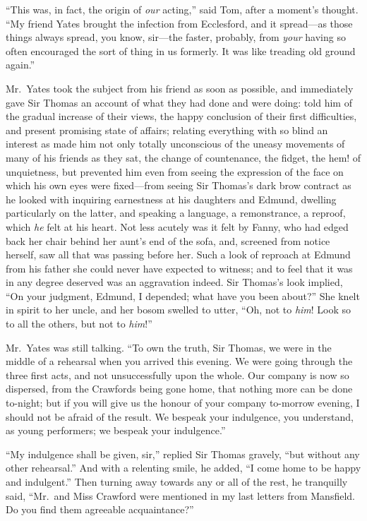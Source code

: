 \documentclass{article}
\begin{document}
``This was, in fact, the origin of \emph{our} acting,'' said Tom,
after a moment's thought.  ``My friend Yates brought the
infection from Ecclesford, and it spread---as those things
always spread, you know, sir---the faster, probably,
from \emph{your} having so often encouraged the sort of thing
in us formerly.  It was like treading old ground again.''

Mr.\ Yates took the subject from his friend as soon as possible,
and immediately gave Sir Thomas an account of what they
had done and were doing:  told him of the gradual
increase of their views, the happy conclusion of their
first difficulties, and present promising state of affairs;
relating everything with so blind an interest as made him
not only totally unconscious of the uneasy movements of many
of his friends as they sat, the change of countenance,
the fidget, the hem! of unquietness, but prevented him
even from seeing the expression of the face on which his
own eyes were fixed---from seeing Sir Thomas's dark brow
contract as he looked with inquiring earnestness at his
daughters and Edmund, dwelling particularly on the latter,
and speaking a language, a remonstrance, a reproof,
which \emph{he} felt at his heart.  Not less acutely was it
felt by Fanny, who had edged back her chair behind her
aunt's end of the sofa, and, screened from notice herself,
saw all that was passing before her.  Such a look
of reproach at Edmund from his father she could never
have expected to witness; and to feel that it was in any
degree deserved was an aggravation indeed.  Sir Thomas's
look implied, ``On your judgment, Edmund, I depended;
what have you been about?''  She knelt in spirit to her uncle,
and her bosom swelled to utter, ``Oh, not to \emph{him}!
Look so to all the others, but not to \emph{him}!''

Mr.\ Yates was still talking.  ``To own the truth, Sir Thomas,
we were in the middle of a rehearsal when you arrived
this evening.  We were going through the three first acts,
and not unsuccessfully upon the whole.  Our company is
now so dispersed, from the Crawfords being gone home,
that nothing more can be done to-night; but if you will
give us the honour of your company to-morrow evening,
I should not be afraid of the result.  We bespeak
your indulgence, you understand, as young performers;
we bespeak your indulgence.''

``My indulgence shall be given, sir,'' replied Sir
Thomas gravely, ``but without any other rehearsal.''
And with a relenting smile, he added, ``I come home
to be happy and indulgent.''  Then turning away towards
any or all of the rest, he tranquilly said, ``Mr.\ and Miss
Crawford were mentioned in my last letters from Mansfield.
Do you find them agreeable acquaintance?''
\end{document}
